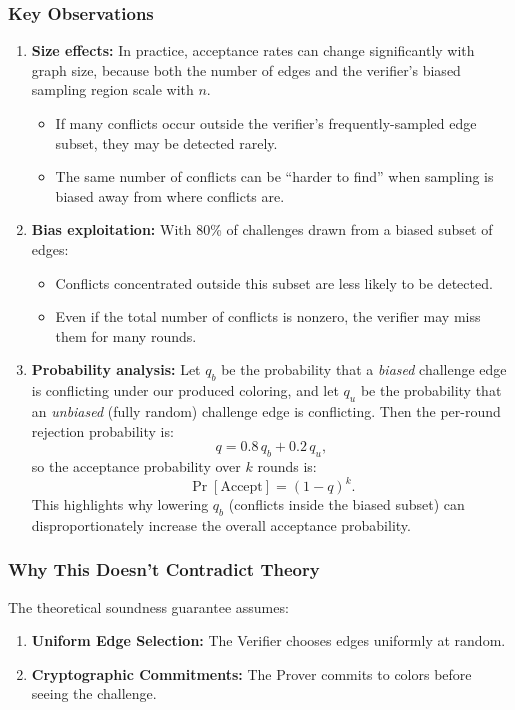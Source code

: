 \documentclass[11pt]{article}
\begin{document}
\subsubsection{Key Observations}
\begin{enumerate}
    \item \textbf{Size effects:} In practice, acceptance rates can change significantly with graph size, because both the number of edges and the verifier's biased sampling region scale with $n$.
    \begin{itemize}
        \item If many conflicts occur outside the verifier's frequently-sampled edge subset, they may be detected rarely.
        \item The same number of conflicts can be ``harder to find'' when sampling is biased away from where conflicts are.
    \end{itemize}
    
    \item \textbf{Bias exploitation:} With 80\% of challenges drawn from a biased subset of edges:
    \begin{itemize}
        \item Conflicts concentrated outside this subset are less likely to be detected.
        \item Even if the total number of conflicts is nonzero, the verifier may miss them for many rounds.
    \end{itemize}
    
    \item \textbf{Probability analysis:} Let $q_b$ be the probability that a \emph{biased} challenge edge is conflicting under our produced coloring, and let $q_u$ be the probability that an \emph{unbiased} (fully random) challenge edge is conflicting. Then the per-round rejection probability is:
    \[
    q = 0.8\,q_b + 0.2\,q_u,
    \]
    so the acceptance probability over $k$ rounds is:
    \[
    \Pr[\text{Accept}] = (1 - q)^k.
    \]
    This highlights why lowering $q_b$ (conflicts inside the biased subset) can disproportionately increase the overall acceptance probability.
\end{enumerate}

\subsubsection{Why This Doesn't Contradict Theory}

The theoretical soundness guarantee assumes:
\begin{enumerate}
    \item \textbf{Uniform Edge Selection:} The Verifier chooses edges uniformly at random.
    \item \textbf{Cryptographic Commitments:} The Prover commits to colors before seeing the challenge.
\end{enumerate}
\end{document}
